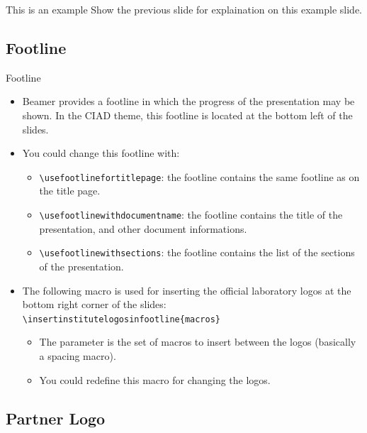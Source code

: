 \documentclass[english,sectioncirclenumberstyle]{ciadbeamer}
\begin{document}
\begin{frame}{{This is} an example}
	Show the previous slide for explaination on this example slide.
\end{frame}

\subsection{Footline}

\begin{frame}[t]{Footline}
	\smaller
	\begin{itemize}
	\item Beamer provides a footline in which the progress of the presentation may be shown.
	In the CIAD theme, this footline is located at the bottom left of the slides.
	\vspace{1em}
	\item You could change this footline with: \begin{itemize}
		\item \texttt{{\textbackslash}usefootlinefortitlepage}: the footline contains the same footline as on the title page.
		\item \texttt{{\textbackslash}usefootlinewithdocumentname}: the footline contains the title of the presentation, and other document informations.
		\item \texttt{{\textbackslash}usefootlinewithsections}: the footline contains the list of the sections of the presentation.
		\end{itemize}
	\vspace{1em}
	\item The following macro is used for inserting the official laboratory logos at the bottom right corner of the slides: \\
		\texttt{{\textbackslash}insertinstitutelogosinfootline\{macros\}}
		\begin{itemize}
		\item The parameter is the set of macros to insert between the logos (basically a spacing macro).
		\item You could redefine this macro for changing the logos.
		\end{itemize}
	\end{itemize}
\end{frame}

\subsection{Partner Logo}
\end{document}
